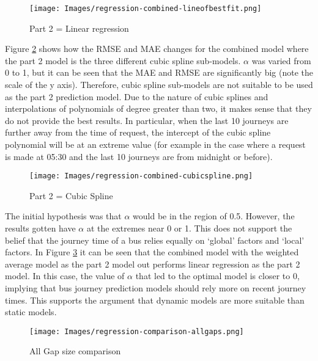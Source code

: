 \begin{figure}[H]
\begin{center}
    \texttt{[image: Images/regression-combined-lineofbestfit.png]}
    \caption{Part 2 = Linear regression}
    \label{fig:regression-part2lineofbestfit}
\end{center}
\end{figure}

Figure \ref{fig:regression-part2cubicspline} shows how the RMSE and MAE changes for the combined model where the part 2 model is the three different cubic spline sub-models. $\alpha$ was varied from 0 to 1, but it can be seen that the MAE and RMSE are significantly big (note the scale of the y axis). Therefore, cubic spline sub-models are not suitable to be used as the part 2 prediction model. Due to the nature of cubic splines and interpolations of polynomials of degree greater than two, it makes sense that they do not provide the best results. In particular, when the last 10 journeys are further away from the time of request, the intercept of the cubic spline polynomial will be at an extreme value (for example in the case where a request is made at 05:30 and the last 10 journeys are from midnight or before).

\begin{figure}[H]
\begin{center}
    \texttt{[image: Images/regression-combined-cubicspline.png]}
    \caption{Part 2 = Cubic Spline}
    \label{fig:regression-part2cubicspline}
\end{center}
\end{figure}

The initial hypothesis was that $\alpha$ would be in the region of 0.5. However, the results gotten have $\alpha$ at the extremes near 0 or 1. This does not support the belief that the journey time of a bus relies equally on `global' factors and `local' factors. In Figure \ref{fig:regression-comparison-allgaps} it can be seen that the combined model with the weighted average model as the part 2 model out performs linear regression as the part 2 model. In this case, the value of $\alpha$ that led to the optimal model is closer to 0, implying that bus journey prediction models should rely more on recent journey times. This supports the argument that dynamic models are more suitable than static models.

\begin{figure}[H]
\begin{center}
    \texttt{[image: Images/regression-comparison-allgaps.png]}
    \caption{All Gap size comparison}
    \label{fig:regression-comparison-allgaps}
\end{center}
\end{figure}

